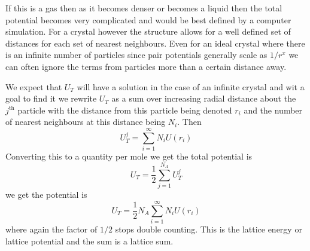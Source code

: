     If this is a gas then as it becomes denser or becomes a liquid then the total potential becomes very complicated and would be best defined by a computer simulation.
    For a crystal however the structure allows for a well defined set of distances for each set of nearest neighbours.
    Even for an ideal crystal where there is an infinite number of particles since pair potentials generally scale as \(1/r^x\) we can often ignore the terms from particles more than a certain distance away.
    
    We expect that \(U_T\) will have a solution in the case of an infinite crystal and wit a goal to find it we rewrite \(U_T\) as a sum over increasing radial distance about the \(j^\text{th}\) particle with the distance from this particle being denoted \(r_i\) and the number of nearest neighbours at this distance being \(N_i\).
    Then
    \[U_T^j = \sum_{i = 1}^\infty N_iU(r_i)\]
    Converting this to a quantity per mole we get the total potential is
    \[U_T = \frac{1}{2}\sum_{j = 1}^{N_A}U_T^j\]
    we get the potential is
    \[U_T = \frac{1}{2}N_A\sum_{i = 1}^\infty N_iU(r_i)\]
    where again the factor of \(1/2\) stops double counting.
    This is the lattice energy or lattice potential and the sum is a lattice sum.
    
